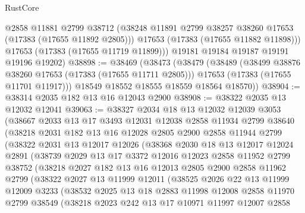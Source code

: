 \begin{lexlean}{RustCore}
\begin{coremodule}
          @2858
          @11881
          @2799
          @38712
          (@38248 @11891 @2799 @38257 @38260 @17653 (@17383 (@17655 @11892 @2805)))
          @17653
          (@17383 (@17655 @11882 @11898)))
        @17653
        (@17383 (@17655 @11719 @11899)))
      @19181
      @19184
      @19187
      @19191
      @19196
      @19202)
@38898 := @38469
    (@38473
      (@38479
        (@38489
          (@38499 @38876 @38260 @17653 (@17383 (@17655 @11711 @2805)))
          @17653
          (@17383 (@17655 @11701 @11917)))
        @18549
        @18552
        @18555
        @18559
        @18564
        @18570))
@38904 := @38314 @2035 @182 @13 @16 @12043 @2900
@38908 := @38322 @2035 @13 @12032 @12041
@39063 := @38327
    @2034
    @18
    @13
    @12032
    @12039
    @3053
    (@38667
      @2033
      @13
      @17
      @3493
      @12031
      @12038
      @2858
      @11934
      @2799
      @38640
      (@38218
        @2031
        @182
        @13
        @16
        @12028
        @2805
        @2900
        @2858
        @11944
        @2799
        (@38322
          @2031
          @13
          @12017
          @12026
          (@38368
            @2030
            @18
            @13
            @12017
            @12024
            @2891
            (@38739
              @2029
              @13
              @17
              @3372
              @12016
              @12023
              @2858
              @11952
              @2799
              @38752
              (@38218
                @2027
                @182
                @13
                @16
                @12013
                @2805
                @2900
                @2858
                @11962
                @2799
                (@38322
                  @2027
                  @13
                  @11999
                  @12011
                  (@38525
                    @2026
                    @22
                    @13
                    @11999
                    @12009
                    @3233
                    (@38532
                      @2025
                      @13
                      @18
                      @2883
                      @11998
                      @12008
                      @2858
                      @11970
                      @2799
                      @38549
                      (@38218
                        @2023
                        @242
                        @13
                        @17
                        @10971
                        @11997
                        @12007
                        @2858

\end{coremodule}
\end{lexlean}
